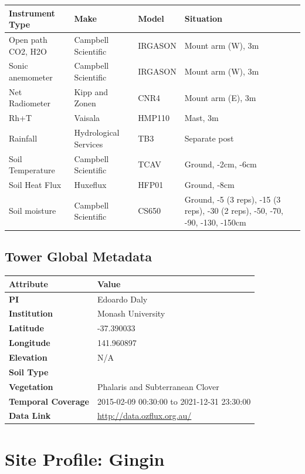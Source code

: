 \documentclass[11pt,a4paper]{article}
\begin{document}
\begin{longtable}{p{4.5cm}p{3.5cm}p{3.5cm}p{3.5cm}}
\toprule
\textbf{Instrument Type} & \textbf{Make} & \textbf{Model} & \textbf{Situation} \\
\midrule
\endhead
\bottomrule
\endfoot
Open path  CO2, H2O & Campbell Scientific & IRGASON & Mount arm (W), 3m \\
Sonic anemometer & Campbell Scientific & IRGASON & Mount arm (W), 3m \\
Net Radiometer & Kipp and Zonen & CNR4 & Mount arm (E), 3m \\
Rh+T & Vaisala & HMP110 & Mast, 3m \\
Rainfall & Hydrological Services & TB3 & Separate post \\
Soil Temperature & Campbell Scientific & TCAV & Ground, -2cm, -6cm \\
Soil Heat Flux & Huxeflux & HFP01 & Ground, -8cm \\
Soil moisture & Campbell Scientific & CS650 & Ground, -5 (3 reps), -15 (3 reps), -30 (2 reps), -50, -70, -90, -130, -150cm \\
\end{longtable}


\subsection*{Tower Global Metadata}

\begin{longtable}{p{4.5cm}p{10.5cm}}
\toprule
\textbf{Attribute} & \textbf{Value} \\
\midrule
\endhead
\bottomrule
\endfoot
\textbf{PI} & Edoardo Daly \\
\textbf{Institution} & Monash University \\
\textbf{Latitude} & -37.390033 \\
\textbf{Longitude} & 141.960897 \\
\textbf{Elevation} & N/A \\
\textbf{Soil Type} &  \\
\textbf{Vegetation} & Phalaris and Subterranean Clover \\
\textbf{Temporal Coverage} & 2015-02-09 00:30:00 to 2021-12-31 23:30:00 \\
\textbf{Data Link} & \url{http://data.ozflux.org.au/} \\
\end{longtable}

\newpage

\section{Site Profile: Gingin}
\end{document}

